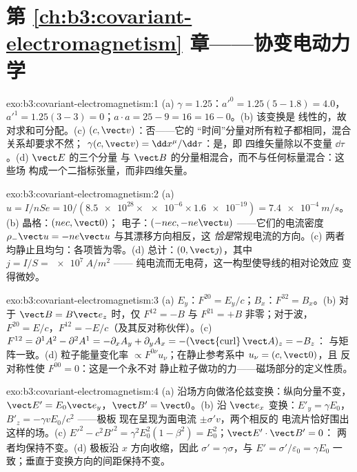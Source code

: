 \section*{第 \ref{ch:b3:covariant-electromagnetism} 章——协变电动力学}

\begin{solution}{exo:b3:covariant-electromagnetism:1}
(a) $\gamma = 1.25$：$a'^0 = 1.25(5 - 1.8) = 4.0$，$a'^1 = 1.25(3 -
3) = 0$；$a\cdot a = 25 - 9 = 16 = 16 - 0$。(b) 该变换是
线性的，故对求和可分配。(c) $(c, \vect v)$：否——它的
“时间”分量对所有粒子都相同，混合关系却要求不然；
$\gamma(c, \vect v) = \dd x^\mu/\dd\tau$：是，即
四维矢量除以不变量 $\dd\tau$。(d) $\vect E$ 的三个分量
与 $\vect B$ 的分量相混合，而不与任何标量混合：这些场
构成一个二指标张量，而非四维矢量。
\end{solution}

\begin{solution}{exo:b3:covariant-electromagnetism:2}
(a) $u = I/nSe = 10/(\num{8.5e28} \times \num{e-6} \times
\num{1.6e-19}) = \qty{7.4e-4}{m/s}$。(b) 晶格：$(nec, \vect 0)$；
电子：$(-nec, -ne\vect u)$ ——它们的电流密度
$\rho_-\vect u = -ne\vect u$ 与其漂移方向相反，这
\emph{恰是}常规电流的方向。(c) 两者均静止且均匀：各项皆为零。(d)
总计：$(0, \vect\jmath)$，其中 $j = I/S = \qty{e7}{A/m^2}$ ——
纯电流而无电荷，这一构型使导线的相对论效应
变得微妙。
\end{solution}

\begin{solution}{exo:b3:covariant-electromagnetism:3}
(a) $E_y$：$F^{20} = E_y/c$；$B_x$：$F^{32} = B_x$。(b) 对于 $\vect B
= B\vect e_z$ 时，仅 $F^{12} = -B$ 与 $F^{21} = +B$ 非零；对于波，
$F^{20} = E/c$，$F^{12} = -E/c$（及其反对称伙伴）。(c)
$F^{12} = \partial^1A^2 - \partial^2A^1 = -\partial_xA_y +
\partial_yA_x = -(\operatorname{\vect{curl}}\vect A)_z = -B_z$：
与矩阵一致。(d) 粒子能量变化率
$\propto F^{0\nu}u_\nu$；在静止参考系中 $u_\nu = (c, \vect 0)$，且
反对称性使 $F^{00} = 0$：这是一个永不对
静止粒子做功的力——磁场部分的定义性质。
\end{solution}

\begin{solution}{exo:b3:covariant-electromagnetism:4}
(a) 沿场方向做洛伦兹变换：纵向分量不变，$\vect
E' = E_0\vect e_y$，$\vect B' = \vect 0$。(b) 沿 $\vect
e_x$ 变换：$E'_y = \gamma E_0$，$B'_z = -\gamma vE_0/c^2$ ——极板
现在呈现为面电流 $\pm\sigma'v$，两个相反的
电流片恰好围出这样的场。(c) $E'^2 - c^2B'^2 =
\gamma^2E_0^2(1 - \beta^2) = E_0^2$；$\vect E'\cdot\vect B' = 0$：
两者均保持不变。(d) 极板沿 $x$ 方向收缩，因此 $\sigma' =
\gamma\sigma$，与 $E' = \sigma'/\varepsilon_0 = \gamma
E_0$ 一致；垂直于变换方向的间距保持不变。
\end{solution}

